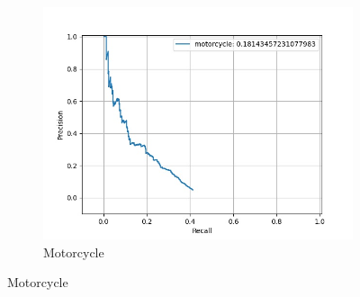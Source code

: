 \begin{figure}
\begin{subfigure}[t]{0.325\textwidth}
    		\includegraphics[width=\textwidth]{images/tuned_pr/class_motorcycle_pr.jpg}
    		\caption{Motorcycle}
    	\end{subfigure}
        	

\end{figure}
